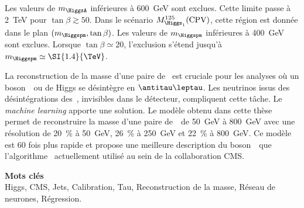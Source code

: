 Les valeurs de $m_{\HiggsA}$ inférieures à \SI{600}{\GeV} sont exclues.
Cette limite passe à
\SI{2}{\TeV} pour $\tan\beta\gtrsim\num{50}$.
Dans le scénario $M_{\Higgs_1}^{125}(\text{CPV})$,
cette région est donnée dans le plan $(m_{\Higgspm},\tan\beta)$.
Les valeurs de $m_{\Higgspm}$ inférieures à \SI{400}{\GeV} sont exclues.
Lorsque
$\tan\beta\simeq\num{20}$,
l'exclusion s'étend jusqu'à
$m_{\Higgspm} \simeq \SI{1.4}{\TeV}$.
\par
La reconstruction de la masse d'une paire de \tau\
est cruciale pour les analyses
où un boson~\Zboson\ ou de Higgs se désintègre en $\antitau\leptau$.
Les neutrinos issus des désintégrations des~\tau, invisibles dans le détecteur, compliquent cette tâche.
Le \emph{machine learning} apporte une solution.
Le modèle obtenu dans cette thèse permet
de reconstruire la masse d'une paire de~\tau\
de \SI{50}{\GeV} à \SI{800}{\GeV}
avec une résolution de
\SI{20}{\%} à \SI{50}{\GeV},
\SI{26}{\%} à \SI{250}{\GeV} et
\SI{22}{\%} à \SI{800}{\GeV}.
Ce modèle est
60 fois plus rapide
et propose une meilleure description du boson~\Zboson\
que l'algorithme \SVFIT\ actuellement utilisé au sein de la collaboration CMS.

\vfill

\noindent\textbf{\Large\sffamily Mots clés}\\
Higgs,
CMS,
Jets,
Calibration,
Tau,
Reconstruction de la masse,
Réseau de neurones,
Régression.

\vspace{2\baselineskip}